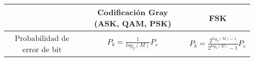 \documentclass[12pt,es,blanco]{uah}
\begin{document}
\begin{center}
        \renewcommand{\arraystretch}{1.5}
        \begin{tabular}{|c|c|c|}
            \hline
            & Codificación Gray (ASK, QAM, PSK) & FSK \\ 
            \hline
            Probabilidad de error de bit & $P_b = \displaystyle\frac{1}{log_2(M)} P_e$ & $P_b = \displaystyle\frac{2^{log_2(M)-1}}{2^{log_2(M)}-1} P_e$ \\
            \hline
        \end{tabular}
        \renewcommand{\arraystretch}{1} 
        \vspace{0.5cm}
    
  

\end{center}
\end{document}
